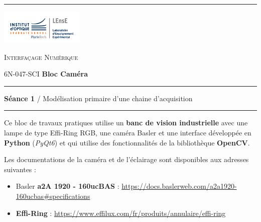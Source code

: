 \documentclass[a4paper,11pt,titlepage]{article} %
\begin{document}
\noindent \rule{\linewidth}{1pt}

\medskip



\newpage
\strut %

\begin{minipage}[c]{.25\linewidth}
	\includegraphics[width=4cm]{images/Logo-LEnsE.png}
\end{minipage} \hfill
\begin{minipage}[c]{.4\linewidth}

\begin{center}
\vspace{0.3cm}
{\Large \textsc{Interfaçage Numérique}}

\medskip

6N-047-SCI \qquad \textbf{\Large Bloc Caméra}

\end{center}
\end{minipage}\hfill

\vspace{0.5cm}

\noindent \rule{\linewidth}{1pt}

{\noindent\Large \rule[-7pt]{0pt}{30pt} \textbf{Séance 1} / Modélisation primaire d'une chaine d'acquisition} 

\noindent \rule{\linewidth}{1pt}

Ce bloc de travaux pratiques utilise un \textbf{banc de vision industrielle} avec une lampe de type Effi-Ring RGB, une caméra Basler et une interface développée en \textbf{Python} (\textit{PyQt6}) et qui utilise des fonctionnalités de la bibliothèque \textbf{OpenCV}.

Les documentations de la caméra et de l'éclairage sont disponibles aux adresses suivantes : 

\begin{itemize}
	\item Basler \textbf{a2A 1920 - 160ucBAS} : \href{https://docs.baslerweb.com/a2a1920-160ucbas#specifications}{https://docs.baslerweb.com/a2a1920-160ucbas\#specifications}
	\item \textbf{Effi-Ring} : \href{https://www.effilux.com/fr/produits/annulaire/effi-ring}{https://www.effilux.com/fr/produits/annulaire/effi-ring}
\end{itemize}
\end{document}
